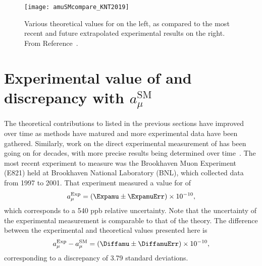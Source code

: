 
\begin{figure}
	\centering
	\texttt{[image: amuSMcompare\_KNT2019]}
	\caption[Comparison between theoretical and experimental values for \amu]{Various theoretical values for \amu on the left, as compared to the most recent and future extrapolated experimental results on the right. From Reference~\cite{Keshavarzi:2019abf}.}
	\label{fig:AlexKPaperComparison}
\end{figure}


\section{Experimental value of \amu and discrepancy with \texorpdfstring{$a_{\mu}^{\text{SM}}$}{amusm}}
\label{sec:Background}


The theoretical contributions to \amu listed in the previous sections have improved over time as methods have matured and more experimental data have been gathered. Similarly, work on the direct experimental measurement of \amu has been going on for decades, with more precise results being determined over time~\cite{PastExperiments}. The most recent experiment to measure \gmtwo was the Brookhaven Muon \gmtwo Experiment (E821) held at Brookhaven National Laboratory (BNL), which collected data from 1997 to 2001. That experiment measured a value for \amu of~\cite{E821FinalReport,CODATA}
		\begin{align}
            a_{\mu}^{\text{Exp}} = (\Expamu \pm \ExpamuErr) \times 10^{-10},
		\end{align}
which corresponds to a 540 ppb relative uncertainty. Note that the uncertainty of the experimental measurement is comparable to that of the theory. The difference between the experimental and theoretical values presented here is
		\begin{align}
            a_{\mu}^{\text{Exp}} - a_{\mu}^{\text{SM}} = (\Diffamu \pm \DiffamuErr) \times 10^{-10},
		\end{align}
corresponding to a discrepancy of 3.79 standard deviations.



